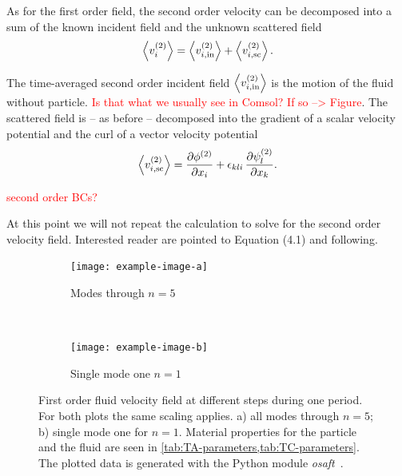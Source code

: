 As for the first order field, the second order velocity can be decomposed into 
a sum of the known incident field and the unknown scattered field
\begin{equation}
  \left\langle v_{i}^{(2)} \right\rangle =
    \left\langle v_{i,\mathrm{in}}^{(2)} \right\rangle +
    \left\langle v_{i,\mathrm{sc}}^{(2)} \right\rangle.
  \label{eq:TA-nd-velocity}
\end{equation}

The time-averaged second order incident field 
$\left\langle v_{i,\mathrm{in}}^{(2)} \right\rangle$ is the motion of the fluid without 
particle. \textcolor{red}{Is that what we usually see in Comsol? If so --> 
Figure}. The scattered field is -- as before -- decomposed into the gradient of 
a scalar velocity potential and the curl of a vector velocity potential
\begin{equation}
  \left\langle v_{i,\mathrm{sc}}^{(2)} \right\rangle =
  \pdv{  \phi^{(2)}  }{x_{i}} + 
  \epsilon_{kli}\,\pdv{  \psi^{(2)}  _{l}}{x_{k}}.
  \label{eq:TA-nd-sc-decomposition}
\end{equation}

\textcolor{red}{second order BCs?}

At this point we will not repeat the calculation to solve for the second order 
velocity field. Interested reader are pointed to  
Equation (4.1) and following.

\begin{figure}
  \centering
  \begin{subfigure}[b]{\textwidth}
    \centering
    \caption{Modes through $n=5$}
    \texttt{[image: example-image-a]}
  \end{subfigure}\\%
  \begin{subfigure}[b]{\textwidth}
    \centering
    \caption{Single mode one $n=1$}
    \texttt{[image: example-image-b]}
  \end{subfigure}
  \caption{First order fluid velocity field at different steps during one 
period. For both plots the same scaling applies. a) all modes through $n=5$; 
b) single mode one for $n=1$. Material properties for the particle and the 
fluid are seen in \cref{tab:TA-parameters,tab:TC-parameters}. The plotted data 
is generated with the Python module \emph{osaft}~\cite{FankhauserPython2022}.}
  \label{fig:TA-AS}
\end{figure}


